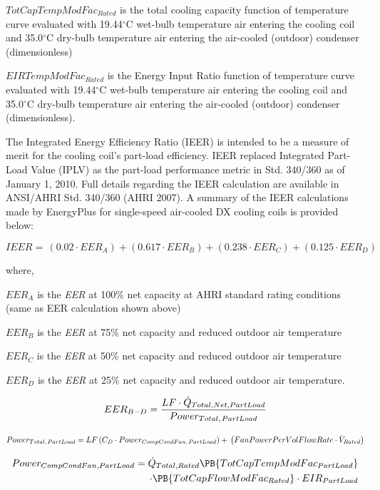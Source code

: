 \(TotCapTempModFa{c_{Rated}}\) is the total cooling capacity function of temperature curve evaluated with 19.44\(^{\circ}\)C wet-bulb temperature air entering the cooling coil and 35.0\(^{\circ}\)C dry-bulb temperature air entering the air-cooled (outdoor) condenser (dimensionless)

\(EIRTempModFa{c_{Rated}}\) is the Energy Input Ratio function of temperature curve evaluated with 19.44\(^{\circ}\)C wet-bulb temperature air entering the cooling coil and 35.0\(^{\circ}\)C dry-bulb temperature air entering the air-cooled (outdoor) condenser (dimensionless).

The Integrated Energy Efficiency Ratio (IEER) is intended to be a measure of merit for the cooling coil's part-load efficiency. IEER replaced Integrated Part-Load Value (IPLV) as the part-load performance metric in Std. 340/360 as of January 1, 2010. Full details regarding the IEER calculation are available in ANSI/AHRI Std. 340/360 (AHRI 2007). A summary of the IEER calculations made by EnergyPlus for single-speed air-cooled DX cooling coils is provided below:

\begin{equation}
IEER = \,(0.02 \cdot EE{R_A}) + (0.617 \cdot EE{R_B}) + (0.238 \cdot EE{R_C}) + (0.125 \cdot EE{R_D})
\end{equation}

where,

\(EE{R_A}\) is the \emph{EER} at 100\% net capacity at AHRI standard rating conditions (same as EER calculation shown above)

\(EE{R_B}\) is the \emph{EER} at 75\% net capacity and reduced outdoor air temperature

\(EE{R_C}\) is the \emph{EER} at 50\% net capacity and reduced outdoor air temperature

\(EE{R_D}\) is the \emph{EER} at 25\% net capacity and reduced outdoor air temperature.

\begin{equation}
EE{R_{B - D}} = \frac{{LF \cdot {{\dot Q}_{Total,Net,PartLoad}}}}{{Powe{r_{Total,{\kern 1pt} PartLoad}}}}
\end{equation}

\begin{equation}
Powe{r_{Total,{\kern 1pt} PartLoad}} = LF\left( {{C_D} \cdot Powe{r_{CompCondFan,{\kern 1pt} PartLoad}}} \right) + \,\left( {FanPowerPerVolFlowRate \cdot {{\dot V}_{Rated}}} \right)
\end{equation}

\begin{equation}
\begin{split}
Power_{CompCondFan,PartLoad} = \dot{Q}_{Total,Rated}\PB{TotCapTempModFac_{PartLoad}} \\ 
\cdot \PB{TotCapFlowModFac_{Rated}} \cdot EIR_{PartLoad}
\end{split}
\end{equation}

